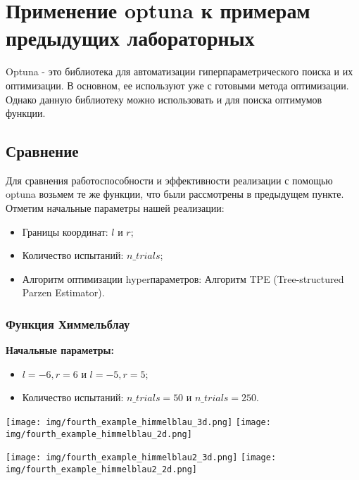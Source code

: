 \documentclass{article}
\begin{document}
\newpage
\section*{Применение optuna к примерам предыдущих лабораторных}
Optuna - это библиотека для автоматизации гиперпараметрического поиска и их оптимизации. В основном, ее используют уже с готовыми метода оптимизации. Однако данную библиотеку можно использовать и для поиска оптимумов функции.
\subsection*{Сравнение}
Для сравнения работоспособности и эффективности реализации с помощью optuna возьмем те же функции, что были рассмотрены в предыдущем пункте. Отметим начальные параметры нашей реализации:
\begin{itemize}
    \item Границы координат: $l$ и $r$;
    \item Количество испытаний: $n\_trials$;
    \item Алгоритм оптимизации hyperпараметров: Алгоритм TPE (Tree-structured Parzen Estimator).
\end{itemize}
\subsubsection*{Функция Химмельблау}
\textbf{Начальные параметры:}
\begin{itemize}
    \item $l = -6, r = 6$ и $l = -5, r = 5$;
    \item Количество испытаний: $n\_trials = 50$ и $n\_trials = 250$.
\end{itemize}
\begin{center}
    \texttt{[image: img/fourth\_example\_himmelblau\_3d.png]}
    \texttt{[image: img/fourth\_example\_himmelblau\_2d.png]}
    \label{fig:enter-label}
\end{center}
\begin{center}
    \texttt{[image: img/fourth\_example\_himmelblau2\_3d.png]}
    \texttt{[image: img/fourth\_example\_himmelblau2\_2d.png]}
    \label{fig:enter-label}
\end{center}
\end{document}
